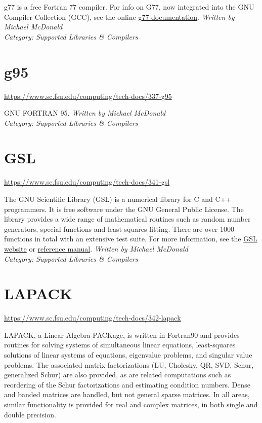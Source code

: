 \documentclass[12pt,a4paper]{article}
\begin{document}
g77 is a free Fortran 77 compiler. For info on G77, now integrated into the GNU Compiler Collection (GCC), see the online \href{https://gcc.gnu.org/onlinedocs/gcc-3.4.6/g77/index.html}{g77 documentation}.
\hfill \textit{Written by Michael McDonald} \\
\hfill \textit{Category: Supported Libraries \& Compilers}

\section{g95}
\url{https://www.sc.fsu.edu/computing/tech-docs/337-g95}

GNU FORTRAN 95.
\hfill \textit{Written by Michael McDonald} \\
\hfill \textit{Category: Supported Libraries \& Compilers}

\section{GSL}
\url{https://www.sc.fsu.edu/computing/tech-docs/341-gsl}

The GNU Scientific Library (GSL) is a numerical library for C and C++ programmers. It is free software under the GNU General Public License. The library provides a wide range of mathematical routines such as random number generators, special functions and least-squares fitting. There are over 1000 functions in total with an extensive test suite. For more information, see the \href{https://www.gnu.org/software/gsl/}{GSL website} or \href{https://www.gnu.org/software/gsl/doc/html/index.html}{reference manual}.
\hfill \textit{Written by Michael McDonald} \\
\hfill \textit{Category: Supported Libraries \& Compilers}

\section{LAPACK}
\url{https://www.sc.fsu.edu/computing/tech-docs/342-lapack}

LAPACK, a Linear Algebra PACKage, is written in Fortran90 and provides routines for solving systems of simultaneous linear equations, least-squares solutions of linear systems of equations, eigenvalue problems, and singular value problems. The associated matrix factorizations (LU, Cholesky, QR, SVD, Schur, generalized Schur) are also provided, as are related computations such as reordering of the Schur factorizations and estimating condition numbers. Dense and banded matrices are handled, but not general sparse matrices. In all areas, similar functionality is provided for real and complex matrices, in both single and double precision.
\end{document}
